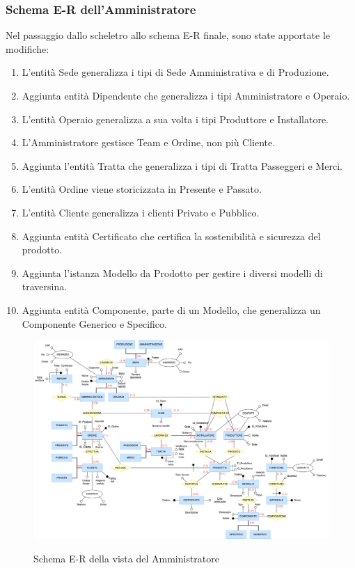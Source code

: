\documentclass{article}
\begin{document}
\subsubsection{Schema E-R dell'Amministratore}
Nel passaggio dallo scheletro allo schema E-R finale, sono state apportate le modifiche:
\begin{enumerate}
    \item L'entità Sede generalizza i tipi di Sede Amministrativa e di Produzione.
    \item Aggiunta entità Dipendente che generalizza i tipi Amministratore e Operaio.
    \item L'entità Operaio generalizza a sua volta i tipi Produttore e Installatore.
    \item L'Amministratore gestisce Team e Ordine, non più Cliente.
    \item Aggiunta l'entità Tratta che generalizza i tipi di Tratta Passeggeri e Merci.
    \item L'entità Ordine viene storicizzata in Presente e Passato.
    \item L'entità Cliente generalizza i clienti Privato e Pubblico.
    \item Aggiunta entità Certificato che certifica la sostenibilità e sicurezza del prodotto.
    \item Aggiunta l'istanza Modello da Prodotto per gestire i diversi modelli di traversina.
    \item Aggiunta entità Componente, parte di un Modello, che generalizza un Componente Generico e Specifico.
\end{enumerate}

\begin{figure}[H]
    \centering
    \includegraphics[width=17cm]{images/rivisto_amministratore.drawio.png}\\
    \caption{Schema E-R della vista del Amministratore}
\end{figure}
\end{document}
